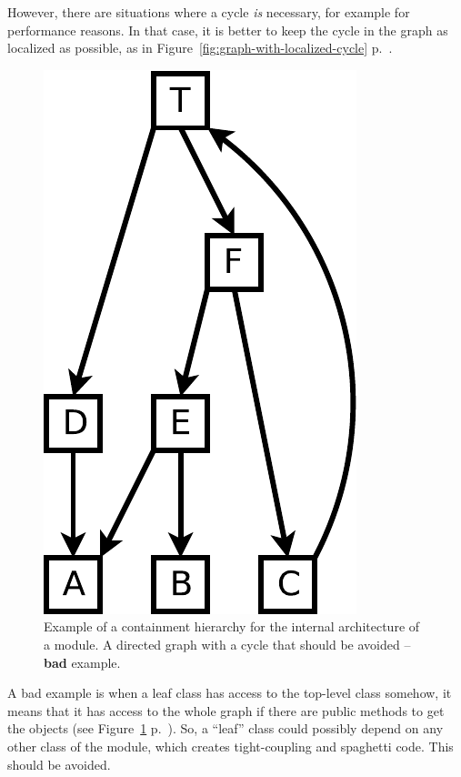 \documentclass[a4paper,11pt]{article}
\begin{document}
However, there are situations where a cycle \emph{is} necessary, for example for performance reasons. In that case, it is better to keep the cycle in the graph as localized as possible, as in Figure~\ref{fig:graph-with-localized-cycle} p.~\pageref{fig:graph-with-localized-cycle}.

\begin{figure}[p]
  \begin{center}
    \includegraphics[scale=0.5]{images/graph-with-bad-cycle.pdf}
    \caption{Example of a containment hierarchy for the internal architecture of a module. A directed graph with a cycle that should be avoided -- \textbf{bad} example.}
    \label{fig:graph-with-bad-cycle}
  \end{center}
\end{figure}

A bad example is when a leaf class has access to the top-level class somehow, it means that it has access to the whole graph if there are public methods to get the objects (see Figure~\ref{fig:graph-with-bad-cycle} p.~\pageref{fig:graph-with-bad-cycle}). So, a ``leaf'' class could possibly depend on any other class of the module, which creates tight-coupling and spaghetti code. This should be avoided.
\end{document}
